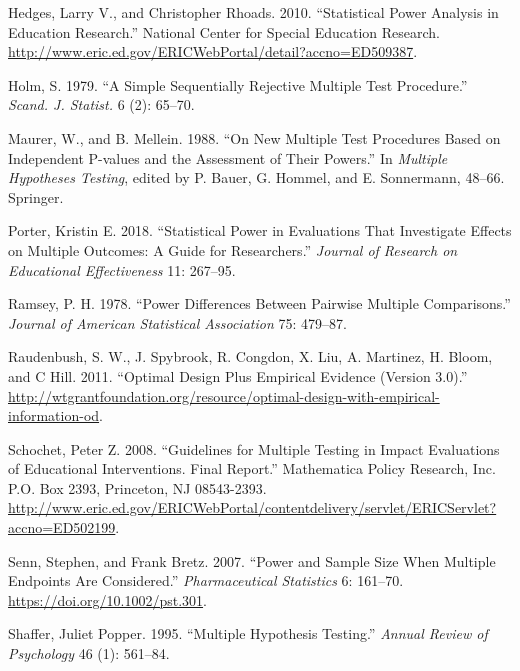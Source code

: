 \documentclass[
]{article}
\newlength{\cslhangindent}
\newlength{\cslentryspacingunit} %
\newenvironment{CSLReferences}[2] %
 {%
  \setlength{\parindent}{0pt}
  \ifodd #1
  \let\oldpar\par
  \def\par{\hangindent=\cslhangindent\oldpar}
  \fi
  \setlength{\parskip}{#2\cslentryspacingunit}
 }%
 {}
\begin{document}
\begin{CSLReferences}{1}{0}
\leavevmode{}%
Hedges, Larry V., and Christopher Rhoads. 2010. {``Statistical Power
Analysis in Education Research.''} National Center for Special Education
Research.
\url{http://www.eric.ed.gov/ERICWebPortal/detail?accno=ED509387}.

\leavevmode{}%
Holm, S. 1979. {``A Simple Sequentially Rejective Multiple Test
Procedure.''} \emph{Scand. J. Statist.} 6 (2): 65--70.

\leavevmode{}%
Maurer, W., and B. Mellein. 1988. {``On New Multiple Test Procedures
Based on Independent {P-values} and the Assessment of Their Powers.''}
In \emph{Multiple Hypotheses Testing}, edited by P. Bauer, G. Hommel,
and E. Sonnermann, 48--66. Springer.

\leavevmode{}%
Porter, Kristin E. 2018. {``Statistical Power in Evaluations That
Investigate Effects on Multiple Outcomes: A Guide for Researchers.''}
\emph{Journal of Research on Educational Effectiveness} 11: 267--95.

\leavevmode{}%
Ramsey, P. H. 1978. {``Power Differences Between Pairwise Multiple
Comparisons.''} \emph{Journal of American Statistical Association} 75:
479--87.

\leavevmode{}%
Raudenbush, S. W., J. Spybrook, R. Congdon, X. Liu, A. Martinez, H.
Bloom, and C Hill. 2011. {``Optimal Design Plus Empirical Evidence
(Version 3.0).''}
\url{http://wtgrantfoundation.org/resource/optimal-design-with-empirical-information-od}.

\leavevmode{}%
Schochet, Peter Z. 2008. {``Guidelines for Multiple Testing in Impact
Evaluations of Educational Interventions. Final Report.''} Mathematica
Policy Research, Inc. P.O. Box 2393, Princeton, NJ 08543-2393.
\url{http://www.eric.ed.gov/ERICWebPortal/contentdelivery/servlet/ERICServlet?accno=ED502199}.

\leavevmode{}%
Senn, Stephen, and Frank Bretz. 2007. {``Power and Sample Size When
Multiple Endpoints Are Considered.''} \emph{Pharmaceutical Statistics}
6: 161--70. \url{https://doi.org/10.1002/pst.301}.

\leavevmode{}%
Shaffer, Juliet Popper. 1995. {``Multiple Hypothesis Testing.''}
\emph{Annual Review of Psychology} 46 (1): 561--84.


\end{CSLReferences}
\end{document}
